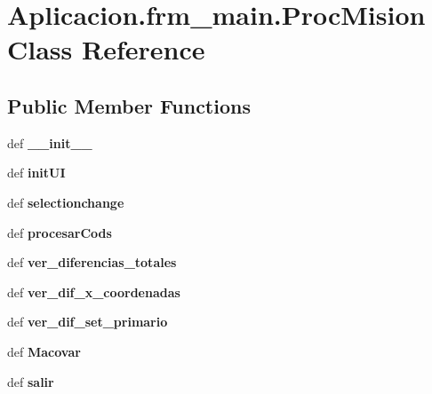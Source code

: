 \section{\-Aplicacion.\-frm\-\_\-main.\-Proc\-Mision \-Class \-Reference}
\label{class_aplicacion_1_1frm__main_1_1_proc_mision}
\subsection*{\-Public \-Member \-Functions}
\begin{DoxyCompactItemize}
\item 
def {\bf \-\_\-\-\_\-init\-\_\-\-\_\-}
\item 
def {\bf init\-U\-I}
\item 
def {\bf selectionchange}
\item 
def {\bf procesar\-Cods}
\item 
def {\bf ver\-\_\-diferencias\-\_\-totales}
\item 
def {\bf ver\-\_\-dif\-\_\-x\-\_\-coordenadas}
\item 
def {\bf ver\-\_\-dif\-\_\-set\-\_\-primario}
\item 
def {\bf \-Macovar}
\item 
def {\bf salir}
\end{DoxyCompactItemize}
